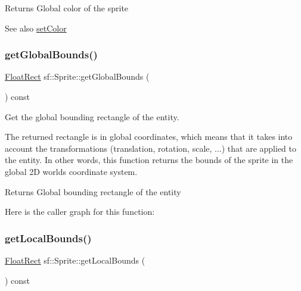 \begin{DoxyReturn}{Returns}
Global color of the sprite
\end{DoxyReturn}
\begin{DoxySeeAlso}{See also}
\hyperlink{classsf_1_1_sprite_a14def44da6437bfea20c4df5e71aba4c}{set\+Color} 
\end{DoxySeeAlso}
\mbox{\label{classsf_1_1_sprite_aa795483096b90745b2e799532963e271}} 
\subsubsection{\texorpdfstring{get\+Global\+Bounds()}{getGlobalBounds()}}
{\footnotesize\ttfamily \hyperlink{classsf_1_1_rect}{Float\+Rect} sf\+::\+Sprite\+::get\+Global\+Bounds (\begin{DoxyParamCaption}{ }\end{DoxyParamCaption}) const}



Get the global bounding rectangle of the entity. 

The returned rectangle is in global coordinates, which means that it takes into account the transformations (translation, rotation, scale, ...) that are applied to the entity. In other words, this function returns the bounds of the sprite in the global 2D world\textquotesingle{}s coordinate system.

\begin{DoxyReturn}{Returns}
Global bounding rectangle of the entity 
\end{DoxyReturn}
Here is the caller graph for this function\+:
\mbox{\label{classsf_1_1_sprite_ab2f4c781464da6f8a52b1df6058a48b8}} 
\subsubsection{\texorpdfstring{get\+Local\+Bounds()}{getLocalBounds()}}
{\footnotesize\ttfamily \hyperlink{classsf_1_1_rect}{Float\+Rect} sf\+::\+Sprite\+::get\+Local\+Bounds (\begin{DoxyParamCaption}{ }\end{DoxyParamCaption}) const}




